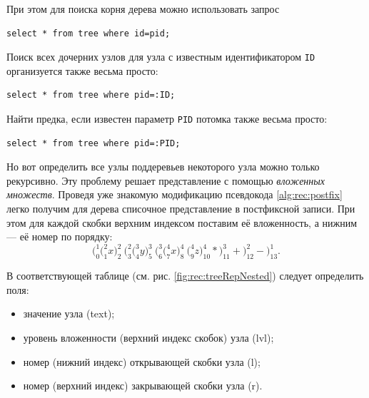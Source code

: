 При этом для поиска корня дерева можно использовать запрос
\begin{verbatim}
select * from tree where id=pid;
\end{verbatim}

Поиск всех дочерних узлов для узла с известным идентификатором \verb"ID" организуется также весьма просто:
\begin{verbatim}
select * from tree where pid=:ID;
\end{verbatim}

Найти предка, если известен параметр \verb"PID" потомка также весьма просто:
\begin{verbatim}
select * from tree where pid=:PID;
\end{verbatim}

Но вот определить все узлы поддеревьев некоторого узла можно только рекурсивно. Эту проблему решает представление с помощью \emph{вложенных множеств}. Проведя уже знакомую модификацию псевдокода \ref{alg:rec:postfix} легко получим для дерева списочное представление в постфиксной записи. При этом для каждой скобки верхним индексом поставим её вложенность, а нижним --- её номер по порядку:
\[
    \Big(_0^1
        \Big(_1^2 x\Big)_2^2\ 
        \Big(_3^2
            \Big(_4^3 y\Big)_5^3\ 
            \Big(_6^3
                \Big(_7^4 x\Big)_8^4\ 
                \Big(_9^4 z\Big)_{10}^4 *
            \Big)_{11}^3 +
        \Big)_{12}^2 -
    \Big)_{13}^1.
\]

В соответствующей таблице (см. рис. \ref{fig:rec:treeRepNested}) следует определить поля:
\begin{itemize}
    \item значение узла (text);
    \item уровень вложенности (верхний индекс скобок) узла (lvl);
    \item номер (нижний индекс) открывающей скобки узла (l);
    \item номер (верхний индекс) закрывающей скобки узла (r).
\end{itemize}

